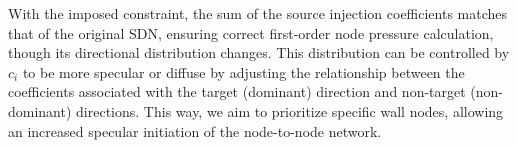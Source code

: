 \documentclass[journal]{IEEEtran}
\begin{document}

With the imposed constraint, the sum of the source injection coefficients matches that of the original SDN, ensuring correct first-order node pressure calculation, though its directional distribution changes. This distribution can be controlled by $c_i$ to be more specular or diffuse by adjusting the relationship between the coefficients associated with the target (dominant) direction and non-target (non-dominant) directions. This way, we aim to prioritize specific wall nodes, allowing an increased specular initiation of the node-to-node network.

\end{document}
